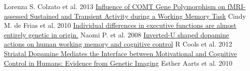 \documentclass[11pt,a4paper]{article}
\begin{document}
\begin{thebibliography}{9}
  Lorenza S. Colzato et al. 2013
  \href{http://www.mitpressjournals.org/doi/abs/10.1162/jocn.2009.21318}{Influence of COMT Gene Polymorphism on fMRI-assessed Sustained and Transient Activity during a Working Memory Task}
  Cindy M. de Frias et al. 2010
  \href{http://psycnet.apa.org/index.cfm?fa=buy.optionToBuy&uid=2008-05019-001}{Individual differences in executive functions are almost entirely genetic in origin.}
  Naomi P. et al. 2008
  \href{http://www.ncbi.nlm.nih.gov/pmc/articles/PMC3111448/}{Inverted-U shaped dopamine actions on human working memory and cognitive control}
  R Cools et al. 2012
  \href{http://www.nature.com/npp/journal/v35/n9/abs/npp201068a.html}{Striatal Dopamine Mediates the Interface between Motivational and Cognitive Control in Humans: Evidence from Genetic Imaging}
  Esther Aarts et al. 2010

\end{thebibliography}
\end{document}
